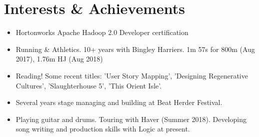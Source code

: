 \documentclass[fontsize=10pt]{tccv}
\begin{document}
\section{Interests \& Achievements}

\begin{itemize}

\item{Hortonworks Apache Hadoop 2.0 Developer certification}

\item{Running \&  Athletics. 10+ years with Bingley Harriers. 1m 57s for 800m (Aug 2017), 1.76m HJ (Aug 2018)}

\item{Reading! Some recent titles: 'User Story Mapping', 'Designing Regenerative Cultures', 'Slaughterhouse 5', 'This Orient Isle'.}

\item{Several years stage managing and building at Beat Herder Festival.}

\item{Playing guitar and drums. Touring with Haver (Summer 2018). Developing song writing and production skills with Logic at present.}

\end{itemize}
\end{document}
